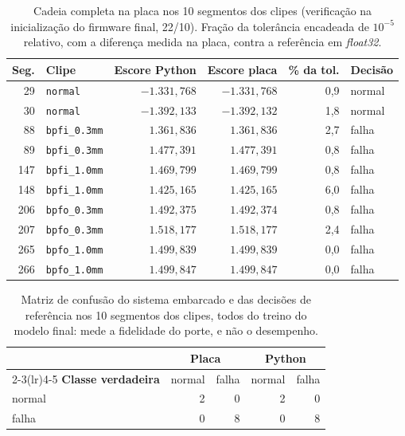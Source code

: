 \begin{table}[H]
\centering
\caption{Cadeia completa na placa nos 10 segmentos dos clipes (verificação na inicialização do firmware final, 22/10). Fração da tolerância encadeada de $10^{-5}$ relativo, com a diferença medida na placa, contra a referência em \emph{float32}.}
\label{tab:clipes_placa_segmentos}
\small
\begin{tabular}{rlrrrl}
\toprule
\textbf{Seg.} & \textbf{Clipe} & \textbf{Escore Python} & \textbf{Escore placa} & \textbf{\% da tol.} & \textbf{Decisão} \\
\midrule
29 & \texttt{normal} & $-1.331{,}768$ & $-1.331{,}768$ & 0,9 & normal \\
30 & \texttt{normal} & $-1.392{,}133$ & $-1.392{,}132$ & 1,8 & normal \\
88 & \texttt{bpfi\_0.3mm} & $1.361{,}836$ & $1.361{,}836$ & 2,7 & falha \\
89 & \texttt{bpfi\_0.3mm} & $1.477{,}391$ & $1.477{,}391$ & 0,8 & falha \\
147 & \texttt{bpfi\_1.0mm} & $1.469{,}799$ & $1.469{,}799$ & 0,8 & falha \\
148 & \texttt{bpfi\_1.0mm} & $1.425{,}165$ & $1.425{,}165$ & 6,0 & falha \\
206 & \texttt{bpfo\_0.3mm} & $1.492{,}375$ & $1.492{,}374$ & 0,8 & falha \\
207 & \texttt{bpfo\_0.3mm} & $1.518{,}177$ & $1.518{,}177$ & 2,4 & falha \\
265 & \texttt{bpfo\_1.0mm} & $1.499{,}839$ & $1.499{,}839$ & 0,0 & falha \\
266 & \texttt{bpfo\_1.0mm} & $1.499{,}847$ & $1.499{,}847$ & 0,0 & falha \\
\bottomrule
\end{tabular}
\end{table}

\begin{table}[H]
\centering
\caption{Matriz de confusão do sistema embarcado e das decisões de referência nos 10 segmentos dos clipes, todos do treino do modelo final: mede a fidelidade do porte, e não o desempenho.}
\label{tab:clipes_placa_matriz}
\small
\begin{tabular}{lrrrr}
\toprule
 & \multicolumn{2}{c}{\textbf{Placa}} & \multicolumn{2}{c}{\textbf{Python}} \\
\cmidrule(lr){2-3}\cmidrule(lr){4-5}
\textbf{Classe verdadeira} & normal & falha & normal & falha \\
\midrule
normal & 2 & 0 & 2 & 0 \\
falha & 0 & 8 & 0 & 8 \\
\bottomrule
\end{tabular}
\end{table}
